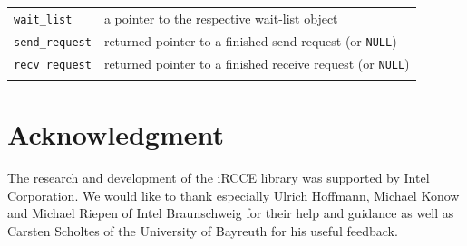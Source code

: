 \documentclass[fontsize=10pt, paper=a4, DIV12, pagesize=auto]{scrartcl}
\begin{document}
\begin{tabular}{ll}
\texttt{wait\_list}    & a pointer to the respective wait-list object \\
\texttt{send\_request} & returned pointer to a finished send request (or \texttt{NULL}) \\
\texttt{recv\_request} & returned pointer to a finished receive request (or \texttt{NULL}) \\
\hspace{2.0cm}
\end{tabular}

\section*{Acknowledgment}
The research and development of the iRCCE library was supported by Intel Corporation.
We would like to thank especially Ulrich Hoffmann, Michael Konow and Michael Riepen of Intel Braunschweig for their help and guidance as well as Carsten Scholtes of the University of Bayreuth for his useful feedback.

\small 


\end{document}
